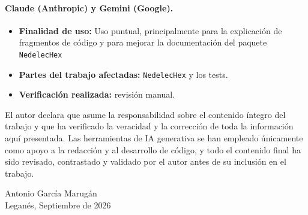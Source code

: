 \documentclass[12pt]{report} %
\begin{document}
\paragraph{Claude (Anthropic) y Gemini (Google).}
\begin{itemize}
	\item \textbf{Finalidad de uso:} Uso puntual, principalmente para la explicación de fragmentos de código y para mejorar la documentación del paquete \texttt{NedelecHex}
	\item \textbf{Partes del trabajo afectadas:} \texttt{NedelecHex} y los tests.
	\item \textbf{Verificación realizada:} revisión manual.
\end{itemize}

El autor declara que asume la responsabilidad sobre el contenido íntegro del trabajo y que ha verificado la veracidad y la corrección de toda la información aquí presentada. Las herramientas de IA generativa se han empleado únicamente como apoyo a la redacción y al desarrollo de código, y todo el contenido final ha sido revisado, contrastado y validado por el autor antes de su inclusión en el trabajo.

\vspace{1cm}

\begin{flushright}
Antonio García Marugán\\
Leganés, Septiembre de 2026
\end{flushright}
\end{document}
